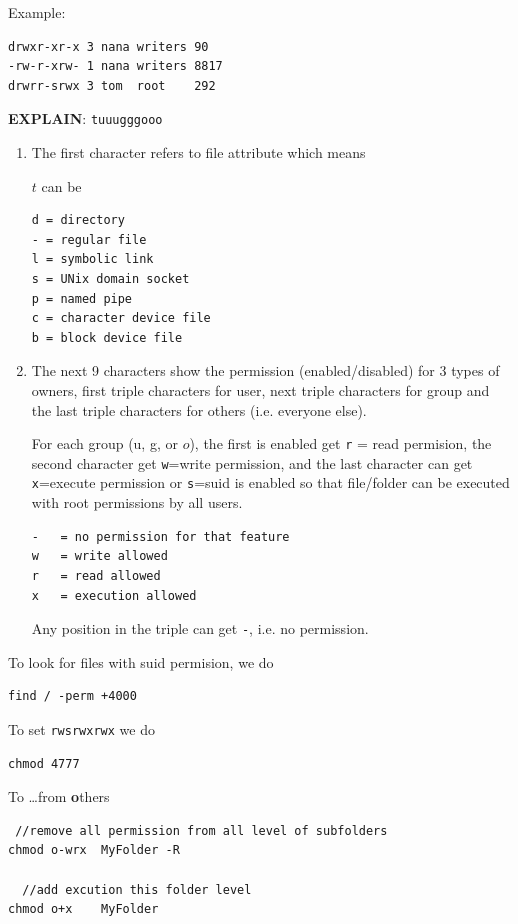 Example:  
\begin{verbatim}
drwxr-xr-x 3 nana writers 90
-rw-r-xrw- 1 nana writers 8817 
drwrr-srwx 3 tom  root    292
\end{verbatim}

{\bf EXPLAIN}: \verb!tuuugggooo!
\begin{enumerate}
  \item  The first character refers to file attribute which means
  
$t$ can be 
\begin{verbatim}
d = directory
- = regular file
l = symbolic link
s = UNix domain socket
p = named pipe
c = character device file
b = block device file
\end{verbatim}

  \item The next 9 characters show the permission (enabled/disabled) for 3 types
  of owners, first triple characters for user, next triple characters for group and
the last triple characters for others (i.e. everyone else).

For each group (u, g, or $o$), the first is
enabled get \verb!r! = read permision, the second character get \verb!w!=write
permission, and the last  character can get \verb!x!=execute permission or
\verb!s!=suid is  enabled so that file/folder can be executed with root
permissions by all users. 

\begin{verbatim}
-   = no permission for that feature
w   = write allowed
r   = read allowed
x   = execution allowed
\end{verbatim}
Any position in the triple can get \verb!-!, i.e. no permission. 
 
\end{enumerate}

To look for files with suid permision, we do
\begin{verbatim}
find / -perm +4000
\end{verbatim}

To set \verb!rwsrwxrwx! we do
\begin{verbatim}
chmod 4777
\end{verbatim}

To \ldots from {\bf o}thers
\begin{verbatim}
 //remove all permission from all level of subfolders
chmod o-wrx  MyFolder -R

  //add excution this folder level 
chmod o+x    MyFolder 
\end{verbatim}


